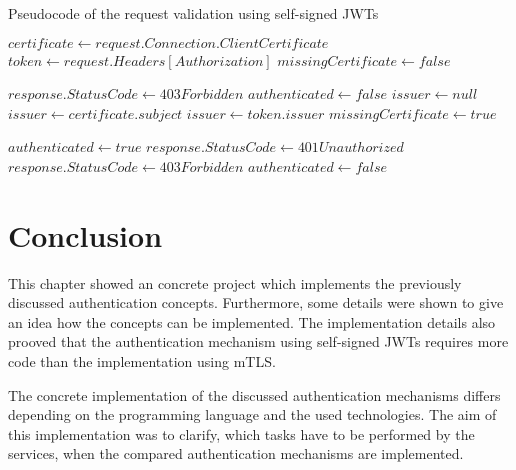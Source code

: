 \begin{algorithm}[H]
	\caption{Pseudocode of the request validation using self-signed JWTs}\label{alg:jwt}
	\begin{algorithmic}
		\State $certificate \gets request.Connection.ClientCertificate$
		\State $token \gets request.Headers[Authorization]$
		\State $missingCertificate \gets false$

		\State $response.StatusCode \gets 403Forbidden$
		\State $authenticated \gets false$
		\Else
		\State $issuer \gets null$
		\State $issuer \gets certificate.subject$
		\EndIf
		\EndIf
		\Else
		\State $issuer \gets token.issuer$
		\Else
		\State $missingCertificate \gets true$
		\EndIf
		\EndIf

		\State $authenticated \gets true$
		\Else
		\State $response.StatusCode \gets 401Unauthorized$
		\Else
		\State $response.StatusCode \gets 403Forbidden$
		\EndIf
		\State $authenticated \gets false$
		\EndIf
		\EndIf
	\end{algorithmic}
\end{algorithm}

\section{Conclusion}
This chapter showed an concrete project which implements the previously discussed authentication concepts.
Furthermore, some details were shown to give an idea how the concepts can be implemented.
The implementation details also prooved that the authentication mechanism using self-signed JWTs requires more code than the implementation using mTLS.

The concrete implementation of the discussed authentication mechanisms differs depending on the programming language and the used technologies.
The aim of this implementation was to clarify, which tasks have to be performed by the services, when the compared authentication mechanisms are implemented.
